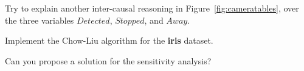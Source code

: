 \newpage
{} 

\begin{question}
Try to explain another inter-causal reasoning in Figure~\ref{fig:cameratables}, over the three variables $Detected$, $Stopped$, and $Away$. 
\end{question}


\begin{question}
Implement the Chow-Liu algorithm for the \textbf{iris} dataset.  
\end{question}


\begin{question}
Can you propose a solution for the sensitivity analysis?   
\end{question}